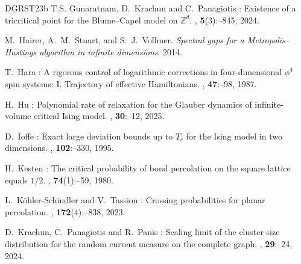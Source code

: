 \documentclass[11pt,a4paper]{article}
\theoremstyle{definition}
\numberwithin{equation}{section}
\begin{document}
\begin{thebibliography}{DGRST23b}
T.S. \bgroup\fonteauteurs\bgroup Gunaratnam\egroup\egroup{}, D.~\bgroup\fonteauteurs\bgroup Krachun\egroup\egroup{} and C.~\bgroup\fonteauteurs\bgroup Panagiotis\egroup\egroup{} :
\newblock Existence of a tricritical point for the {B}lume--{C}apel model on $\mathbb{Z}^d$.
, \textbf{5}(3)\string:--845, 2024.


\bgroup\fonteauteurs\bgroup M.~Hairer, A.~M.~Stuart, and S.~J.~Vollmer\egroup\egroup. 
\emph{Spectral gaps for a Metropolis--Hastings algorithm in infinite dimensions}. 
2014.

T.~\bgroup\fonteauteurs\bgroup Hara\egroup\egroup{} :
\newblock A rigorous control of logarithmic corrections in four-dimensional $\phi^4$ spin systems: {I}. {T}rajectory of effective {H}amiltonians.
, \textbf{47}\string:--98, 1987.

H.~\bgroup\fonteauteurs\bgroup Hu\egroup\egroup{} :
\newblock Polynomial rate of relaxation for the Glauber dynamics of infinite-volume critical Ising model.
, \textbf{30}\string:--12, 2025.

D.~\bgroup\fonteauteurs\bgroup Ioffe\egroup\egroup{} :
\newblock Exact large deviation bounds up to $T_c$ for the {I}sing model in two dimensions.
, \textbf{102}\string:--330, 1995.

H.~\bgroup\fonteauteurs\bgroup Kesten\egroup\egroup{} :
\newblock The critical probability of bond percolation on the square lattice equals $1/2$.
, \textbf{74}(1)\string:--59, 1980.


L.~\bgroup\fonteauteurs\bgroup K{\"o}hler-Schindler\egroup\egroup{} and V.~\bgroup\fonteauteurs\bgroup Tassion\egroup\egroup{} :
\newblock Crossing probabilities for planar percolation.
, \textbf{172}(4)\string:--838, 2023.

D.~\bgroup\fonteauteurs\bgroup Krachun\egroup\egroup{}, C.~\bgroup\fonteauteurs\bgroup Panagiotis\egroup\egroup{} and R.~\bgroup\fonteauteurs\bgroup Panis\egroup\egroup{} :
\newblock Scaling limit of the cluster size distribution for the random current measure on the complete graph.
, \textbf{29}\string:--24, 2024.


\end{thebibliography}
\end{document}
